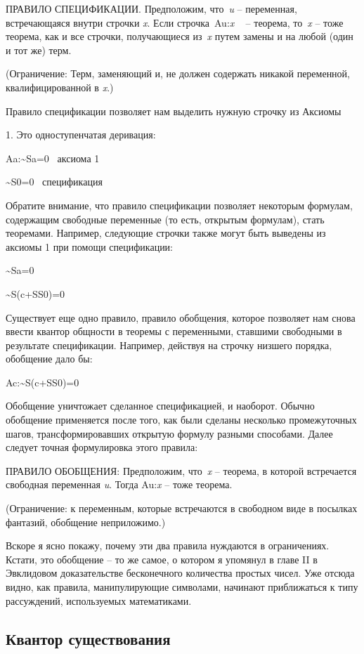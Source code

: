 \documentclass[../main.tex]{subfiles}
\begin{document}
ПРАВИЛО СПЕЦИФИКАЦИИ\@. Предположим, что~\emph{u} \--- переменная, встречающаяся внутри строчки \emph{x}. Если строчка~Au:\emph{x} ~ \--- теорема, то~\emph{x} \--- тоже теорема, как и все строчки, получающиеся из~\emph{x} путем замены и на любой (один и тот же) терм.

(Ограничение: Терм, заменяющий и, не должен содержать никакой переменной, квалифицированной в \emph{x}.)

Правило спецификации позволяет нам выделить нужную строчку из Аксиомы

1. Это одноступенчатая деривация:

Aa:\textasciitilde Sa=0~ аксиома 1

\textasciitilde S0=0~ спецификация

Обратите внимание, что правило спецификации позволяет некоторым формулам, содержащим свободные переменные (то есть, открытым формулам), стать теоремами. Например, следующие строчки также могут быть выведены из аксиомы 1 при помощи спецификации:

\textasciitilde Sa=0

\textasciitilde S(c+SS0)=0

Существует еще одно правило, правило обобщения, которое позволяет нам снова ввести квантор общности в теоремы с переменными, ставшими свободными в результате спецификации. Например, действуя на строчку низшего порядка, обобщение дало бы:

Ac:\textasciitilde S(c+SS0)=0

Обобщение уничтожает сделанное спецификацией, и наоборот. Обычно обобщение применяется после того, как были сделаны несколько промежуточных шагов, трансформировавших открытую формулу разными способами. Далее следует точная формулировка этого правила:

ПРАВИЛО ОБОБЩЕНИЯ: Предположим, что~\emph{x} \--- теорема, в которой встречается свободная переменная \emph{u}. Тогда Au:\emph{x} \--- тоже теорема.

(Ограничение: к переменным, которые встречаются в свободном виде в посылках фантазий, обобщение неприложимо.)

Вскоре я ясно покажу, почему эти два правила нуждаются в ограничениях. Кстати, это обобщение \--- то же самое, о котором я упомянул в главе II в Эвклидовом доказательстве бесконечного количества простых чисел. Уже отсюда видно, как правила, манипулирующие символами, начинают приближаться к типу рассуждений, используемых математиками.


\subsection{Квантор существования}
\end{document}
